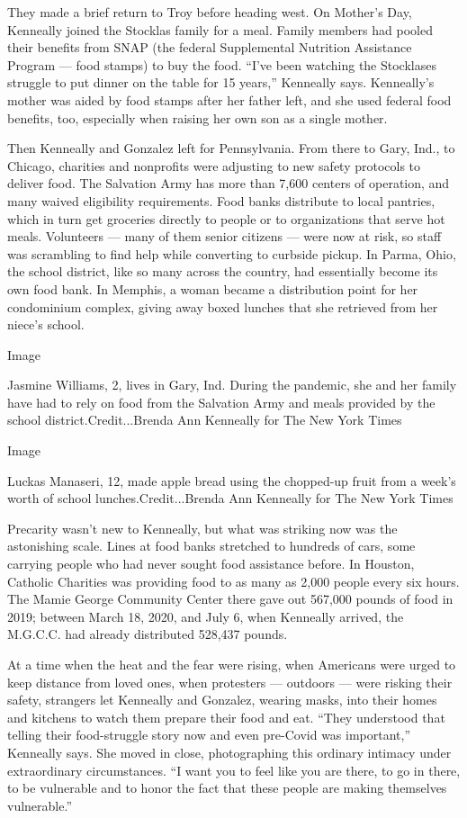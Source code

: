 They made a brief return to Troy before heading west. On Mother's Day,
Kenneally joined the Stocklas family for a meal. Family members had
pooled their benefits from SNAP (the federal Supplemental Nutrition
Assistance Program --- food stamps) to buy the food. ``I've been
watching the Stocklases struggle to put dinner on the table for 15
years,'' Kenneally says. Kenneally's mother was aided by food stamps
after her father left, and she used federal food benefits, too,
especially when raising her own son as a single mother.

Then Kenneally and Gonzalez left for Pennsylvania. From there to Gary,
Ind., to Chicago, charities and nonprofits were adjusting to new safety
protocols to deliver food. The Salvation Army has more than 7,600
centers of operation, and many waived eligibility requirements. Food
banks distribute to local pantries, which in turn get groceries directly
to people or to organizations that serve hot meals. Volunteers --- many
of them senior citizens --- were now at risk, so staff was scrambling to
find help while converting to curbside pickup. In Parma, Ohio, the
school district, like so many across the country, had essentially become
its own food bank. In Memphis, a woman became a distribution point for
her condominium complex, giving away boxed lunches that she retrieved
from her niece's school.

Image

Jasmine Williams, 2, lives in Gary, Ind. During the pandemic, she and
her family have had to rely on food from the Salvation Army and meals
provided by the school district.Credit...Brenda Ann Kenneally for The
New York Times

Image

Luckas Manaseri, 12, made apple bread using the chopped-up fruit from a
week's worth of school lunches.Credit...Brenda Ann Kenneally for The New
York Times

Precarity wasn't new to Kenneally, but what was striking now was the
astonishing scale. Lines at food banks stretched to hundreds of cars,
some carrying people who had never sought food assistance before. In
Houston, Catholic Charities was providing food to as many as 2,000
people every six hours. The Mamie George Community Center there gave out
567,000 pounds of food in 2019; between March 18, 2020, and July 6, when
Kenneally arrived, the M.G.C.C. had already distributed 528,437 pounds.

At a time when the heat and the fear were rising, when Americans were
urged to keep distance from loved ones, when protesters --- outdoors ---
were risking their safety, strangers let Kenneally and Gonzalez, wearing
masks, into their homes and kitchens to watch them prepare their food
and eat. ``They understood that telling their food-struggle story now
and even pre-Covid was important,'' Kenneally says. She moved in close,
photographing this ordinary intimacy under extraordinary circumstances.
``I want you to feel like you are there, to go in there, to be
vulnerable and to honor the fact that these people are making themselves
vulnerable.''

